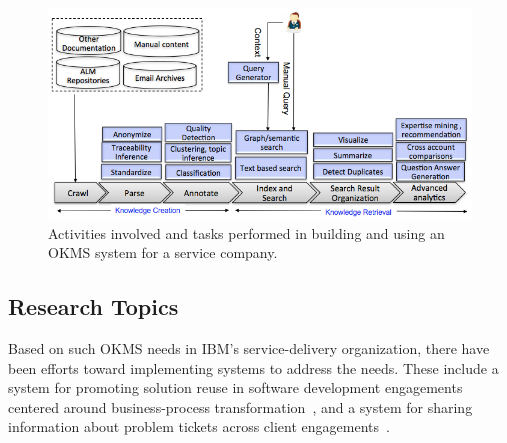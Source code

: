 
\begin{figure}[t]
	\center
	\includegraphics[width=\columnwidth]{figs/km.png}
        \vspace*{-18pt}
	\caption{Activities involved and tasks performed in building and using
          an OKMS system for a service company.}
        \vspace*{-10pt}
	\label{fig-km}
\end{figure}

\subsection{Research Topics}

Based on such OKMS needs in IBM's service-delivery organization, there have been
efforts toward implementing systems to address the needs. These include a system
for promoting solution reuse in software development engagements centered around
business-process transformation~\cite{Goodwin:2012b}, and a system for sharing
information about problem tickets across client
engagements~\cite{Majumdar:2011}.


